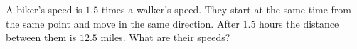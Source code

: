 A biker's speed is $1.5$ times a walker's speed. They start at the same time from the same point and move in the same direction. After $1.5$ hours the distance between them is $12.5$ miles. What are their speeds?
